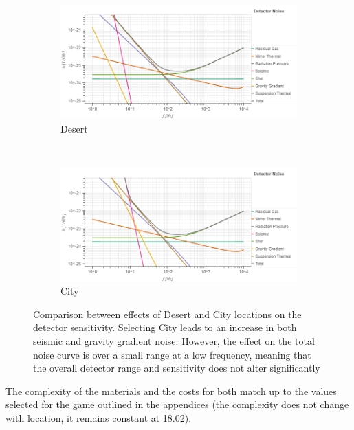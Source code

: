 \documentclass{article}
\begin{document}
    
    \begin{figure}[h!]
\centering
\begin{subfigure}{.8\textwidth}
        \centering
\includegraphics[width=1\linewidth, trim = {0 0 0 1cm}, clip]{aLIGODesert.png}
         \caption{Desert}
         \label{fig::PowerStages}
         \end{subfigure}%
         \\
        \begin{subfigure}{.8\textwidth}
        \centering
        \includegraphics[width=1\linewidth, trim = {0 0 0 0.9cm}, clip]{aLIGOCity.png}
\caption{City}
          \label{fig::aLIGODesertCity}
         \end{subfigure}
         \caption{Comparison between effects of Desert and City
           locations on the detector sensitivity. Selecting City leads
           to an increase in both seismic and gravity gradient
           noise. However, the effect on the total noise curve is over
           a small range at a low frequency, meaning that the overall
           detector range and sensitivity does not alter
           significantly}
         \label{fig::aLIGOSiliconCrystal}
 \end{figure}
 
 The complexity of the materials and the costs for both match up to
 the values selected for the game outlined in the appendices (the
 complexity does not change with location, it remains constant at
 18.02). 
\end{document}
